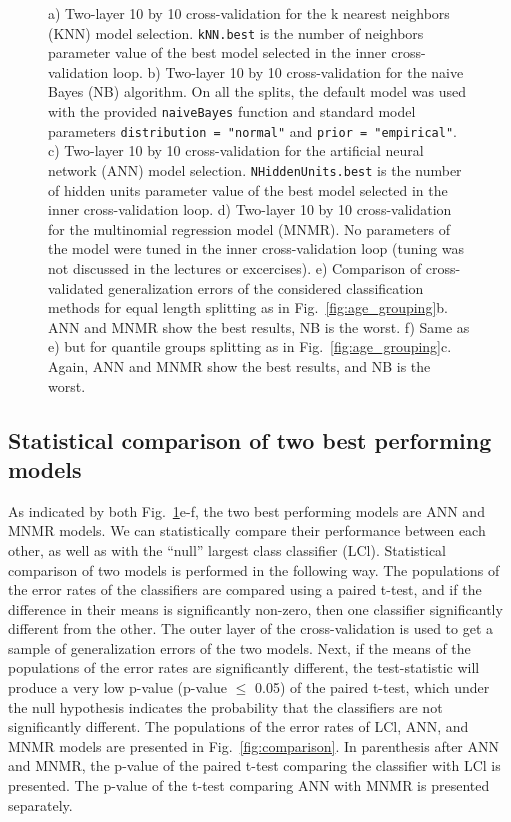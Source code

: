 \documentclass[10pt, paper=a4]{article}
\begin{document}
\begin{figure}[h!]
\begin{minipage}{0.49\textwidth}
  \end{minipage} \hfill
  \cprotect\caption{a) Two-layer 10 by 10 cross-validation for the k
    nearest neighbors (KNN) model selection.  \verb|kNN.best| is the
    number of neighbors parameter value of the best model selected in
    the inner cross-validation loop.  b) Two-layer 10 by 10
    cross-validation for the naive Bayes (NB) algorithm.  On all the
    splits, the default model was used with the provided
    \verb|naiveBayes| function and standard model parameters
    \verb|distribution = "normal"| and \verb|prior = "empirical"|.  c)
    Two-layer 10 by 10 cross-validation for the artificial neural
    network (ANN) model selection.  \verb|NHiddenUnits.best| is the
    number of hidden units parameter value of the best model selected
    in the inner cross-validation loop.  d) Two-layer 10 by 10
    cross-validation for the multinomial regression model (MNMR). No
    parameters of the model were tuned in the inner cross-validation
    loop (tuning was not discussed in the lectures or excercises). e)
    Comparison of cross-validated generalization errors of the
    considered classification methods for equal length splitting as in
    Fig.~\ref{fig:age_grouping}b.  ANN and MNMR show the best results,
    NB is the worst.  f) Same as e) but for quantile groups splitting
    as in Fig.~\ref{fig:age_grouping}c.  Again, ANN and MNMR show the
    best results, and NB is the worst.}
  \label{fig:performance}
\end{figure}

\subsection{Statistical comparison of two best performing models}
As indicated by both Fig.~\ref{fig:performance}e-f, the two best
performing models are ANN and MNMR models.  We can statistically
compare their performance between each other, as well as with the
``null'' largest class classifier (LCl).  Statistical comparison of
two models is performed in the following way.  The populations of the
error rates of the classifiers are compared using a paired t-test, and
if the difference in their means is significantly non-zero, then one
classifier significantly different from the other.  The outer layer of
the cross-validation is used to get a sample of generalization errors
of the two models.  Next, if the means of the populations of the error
rates are significantly different, the test-statistic will produce a
very low p-value (p-value $\leq$ 0.05) of the paired t-test, which
under the null hypothesis indicates the probability that the
classifiers are not significantly different.  The populations of the
error rates of LCl, ANN, and MNMR models are presented in
Fig.~\ref{fig:comparison}.  In parenthesis after ANN and MNMR, the
p-value of the paired t-test comparing the classifier with LCl is
presented.  The p-value of the t-test comparing ANN with MNMR is
presented separately.
\end{document}
